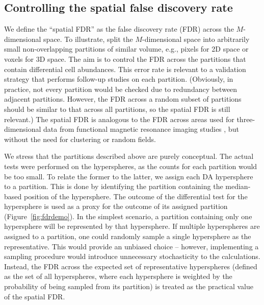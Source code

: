 \documentclass{article}
\begin{document}
\subsection{Controlling the spatial false discovery rate}
We define the ``spatial FDR'' as the false discovery rate (FDR) across the $M$-dimensional space.
To illustrate, split the $M$-dimensional space into arbitrarily small non-overlapping partitions of similar volume, e.g., pixels for 2D space or voxels for 3D space.
The aim is to control the FDR across the partitions that contain differential cell abundances.
This error rate is relevant to a validation strategy that performs follow-up studies on each partition. 
(Obviously, in practice, not every partition would be checked due to redundancy between adjacent partitions.
However, the FDR across a random subset of partitions should be similar to that across all partitions, so the spatial FDR is still relevant.)
The spatial FDR is analogous to the FDR across areas used for three-dimensional data from functional magnetic resonance imaging studies \cite{pacifico2004false,benjamini2007false}, but without the need for clustering or random fields.

We stress that the partitions described above are purely conceptual.
The actual tests were performed on the hyperspheres, as the counts for each partition would be too small.
To relate the former to the latter, we assign each DA hypersphere to a partition.
This is done by identifying the partition containing the median-based position of the hypersphere.
The outcome of the differential test for the hypersphere is used as a proxy for the outcome of its assigned partition (Figure~\ref{fig:fdrdemo}).
In the simplest scenario, a partition containing only one hypersphere will be represented by that hypersphere.
If multiple hyperspheres are assigned to a partition, one could randomly sample a single hypersphere as the representative.
This would provide an unbiased choice -- however, implementing a sampling procedure would introduce unnecessary stochasticity to the calculations.
Instead, the FDR across the expected set of representative hyperspheres (defined as the set of all hyperspheres, where each hypersphere is weighted by the probability of being sampled from its partition) is treated as the practical value of the spatial FDR.  
\end{document}
